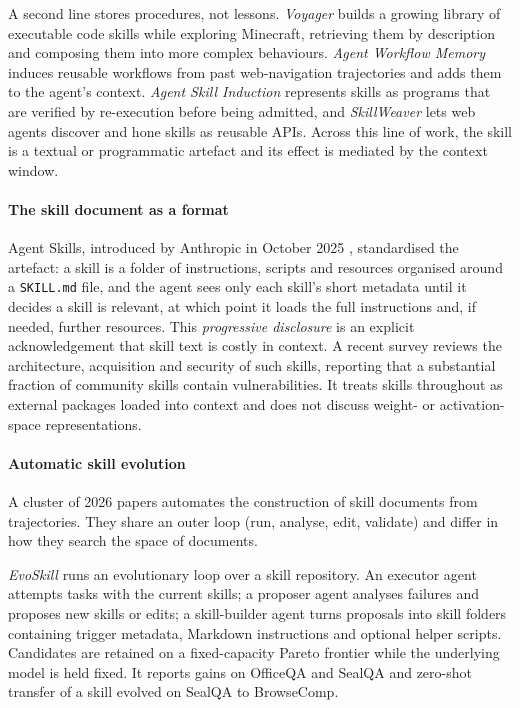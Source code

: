 \documentclass[11pt]{article}
\begin{document}
A second line stores procedures, not lessons. \emph{Voyager} \citep{wang2024voyager} builds a
growing library of executable code skills while exploring Minecraft, retrieving them by description
and composing them into more complex behaviours. \emph{Agent Workflow Memory} \citep{wang2025awm}
induces reusable workflows from past web-navigation trajectories and adds them to the agent's
context. \emph{Agent Skill Induction} \citep{wang2025asi} represents skills as programs that are
verified by re-execution before being admitted, and \emph{SkillWeaver} \citep{zheng2025skillweaver}
lets web agents discover and hone skills as reusable APIs. Across this line of work, the skill is a
textual or programmatic artefact and its effect is mediated by the context window.

\paragraph{The skill document as a format} Agent Skills, introduced by Anthropic in October 2025
\citep{anthropic2025skills}, standardised the artefact: a skill is a folder of instructions, scripts
and resources organised around a \texttt{SKILL.md} file, and the agent sees only each skill's short
metadata until it decides a skill is relevant, at which point it loads the full instructions and, if
needed, further resources. This \emph{progressive disclosure} is an explicit acknowledgement that
skill text is costly in context. A recent survey \citep{xu2026agentskills} reviews the architecture,
acquisition and security of such skills, reporting that a substantial fraction of community skills
contain vulnerabilities. It treats skills throughout as external packages loaded into context and
does not discuss weight- or activation-space representations.

\paragraph{Automatic skill evolution} A cluster of 2026 papers automates the construction of skill
documents from trajectories. They share an outer loop (run, analyse, edit, validate) and differ in
how they search the space of documents.

\emph{EvoSkill} \citep{alzubi2026evoskill} runs an evolutionary loop over a skill repository. An
executor agent attempts tasks with the current skills; a proposer agent analyses failures and
proposes new skills or edits; a skill-builder agent turns proposals into skill folders containing
trigger metadata, Markdown instructions and optional helper scripts. Candidates are retained on a
fixed-capacity Pareto frontier while the underlying model is held fixed. It reports gains on
OfficeQA and SealQA and zero-shot transfer of a skill evolved on SealQA to BrowseComp.
\end{document}
